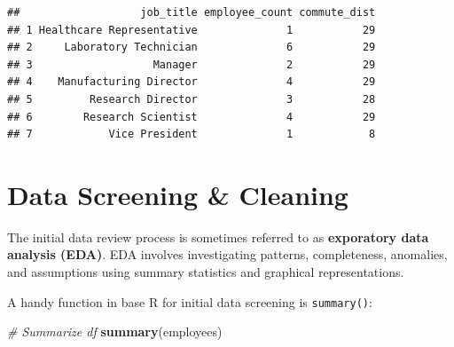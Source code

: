\documentclass[]{book}
\newenvironment{Shaded}{\begin{snugshade}}{\end{snugshade}}
\newcommand{\CommentTok}[1]{\textcolor[rgb]{0.56,0.35,0.01}{\textit{#1}}}
\newcommand{\KeywordTok}[1]{\textcolor[rgb]{0.13,0.29,0.53}{\textbf{#1}}}
\newcommand{\NormalTok}[1]{#1}
\begin{document}
\begin{verbatim}
##                   job_title employee_count commute_dist
## 1 Healthcare Representative              1           29
## 2     Laboratory Technician              6           29
## 3                   Manager              2           29
## 4    Manufacturing Director              4           29
## 5         Research Director              3           28
## 6        Research Scientist              4           29
## 7            Vice President              1            8
\end{verbatim}

\hypertarget{data-screening-cleaning}{%
\section{Data Screening \& Cleaning}\label{data-screening-cleaning}}

The initial data review process is sometimes referred to as \textbf{exporatory data analysis (EDA)}. EDA involves investigating patterns, completeness, anomalies, and assumptions using summary statistics and graphical representations.

A handy function in base R for initial data screening is \texttt{summary()}:

\begin{Shaded}
\begin{Highlighting}[]
\CommentTok{# Summarize df}
\KeywordTok{summary}\NormalTok{(employees)}
\end{Highlighting}
\end{Shaded}
\end{document}
